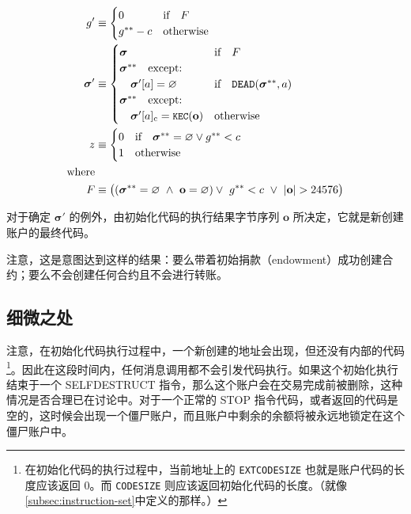 \documentclass[9pt,oneside]{amsart}
\begin{document}
\begin{multicols}{2}
\begin{align}
\quad g' &\equiv \begin{cases}
0 & \text{if} \quad F \\
g^{**} - c & \text{otherwise} \\
\end{cases} \\
\quad \boldsymbol{\sigma}' &\equiv  \begin{cases}
\boldsymbol{\sigma} & \text{if} \quad F \\
\boldsymbol{\sigma}^{**} \quad \text{except:} & \\
\quad\boldsymbol{\sigma}'[a] = \varnothing & \text{if} \quad \mathtt{\tiny DEAD}(\boldsymbol{\sigma}^{**}, a) \\
\boldsymbol{\sigma}^{**} \quad \text{except:} & \\
\quad\boldsymbol{\sigma}'[a]_{\mathrm{c}} = \texttt{\small KEC}(\mathbf{o}) & \text{otherwise}
\end{cases} \\
\quad z &\equiv \begin{cases}
0 & \text{if} \quad \boldsymbol{\sigma}^{**} = \varnothing \lor g^{**} < c \\
1 & \text{otherwise}
\end{cases} \\
\nonumber \text{where} \\
F &\equiv \big((\boldsymbol{\sigma}^{**} = \varnothing \ \wedge\ \mathbf{o} = \varnothing) \vee\  g^{**} < c \ \vee\  |\mathbf{o}| > 24576\big)
\end{align}

对于确定 $\boldsymbol{\sigma}'$ 的例外，由初始化代码的执行结果字节序列 $\mathbf{o}$ 所决定，它就是新创建账户的最终代码。

注意，这是意图达到这样的结果：要么带着初始捐款（endowment）成功创建合约；要么不会创建任何合约且不会进行转账。

\subsection{细微之处}
注意，在初始化代码执行过程中，一个新创建的地址会出现，但还没有内部的代码\footnote{在初始化代码的执行过程中，当前地址上的 \texttt{EXTCODESIZE} 也就是账户代码的长度应该返回 0。而 \texttt{CODESIZE} 则应该返回初始化代码的长度。（就像\ref{subsec:instruction-set}中定义的那样。）}。因此在这段时间内，任何消息调用都不会引发代码执行。如果这个初始化执行结束于一个 {\small SELFDESTRUCT} 指令，那么这个账户会在交易完成前被删除，这种情况是否合理已在讨论中。对于一个正常的 {\small STOP} 指令代码，或者返回的代码是空的，这时候会出现一个僵尸账户，而且账户中剩余的余额将被永远地锁定在这个僵尸账户中。


\end{multicols}
\end{document}
